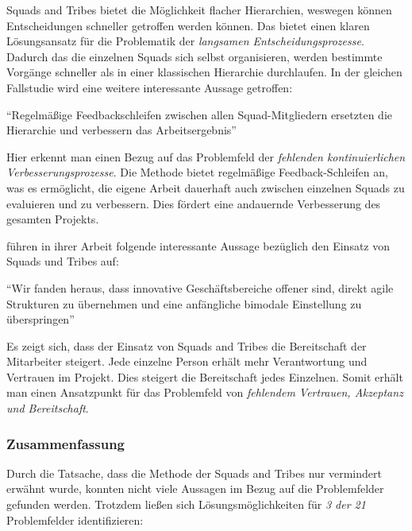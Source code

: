 Squads and Tribes bietet die Möglichkeit flacher Hierarchien, weswegen können Entscheidungen schneller getroffen werden können. Das bietet einen klaren Lösungsansatz für die Problematik der \textit{langsamen Entscheidungsprozesse}. Dadurch das die einzelnen Squads sich selbst  organisieren, werden bestimmte Vorgänge schneller als in einer klassischen Hierarchie durchlaufen. In der gleichen Fallstudie wird eine weitere interessante  Aussage getroffen:

\begin{center}
	``Regelmäßige Feedbackschleifen zwischen allen Squad-Mitgliedern ersetzten die Hierarchie und verbessern das Arbeitsergebnis'' \cite[S. 98]{heinemann_digitale_2016}
\end{center}

Hier erkennt man einen Bezug auf das Problemfeld der \textit{fehlenden kontinuierlichen Verbesserungsprozesse}. Die Methode bietet regelmäßige Feedback-Schleifen an, was es ermöglicht, die eigene Arbeit dauerhaft auch zwischen einzelnen Squads zu evaluieren und zu verbessern. Dies fördert eine andauernde Verbesserung des gesamten Projekts.

 führen in ihrer Arbeit folgende interessante Aussage bezüglich den Einsatz von Squads und Tribes auf:

\begin{center}
	``Wir fanden heraus, dass innovative Geschäftsbereiche offener sind, direkt agile Strukturen zu übernehmen und eine anfängliche bimodale Einstellung zu überspringen'' \cite[S. 9]{gerster_how_2019}
\end{center}

Es zeigt sich, dass der Einsatz von Squads and Tribes die Bereitschaft der Mitarbeiter steigert. Jede einzelne Person erhält mehr Verantwortung und Vertrauen im Projekt. Dies steigert die Bereitschaft jedes Einzelnen. Somit erhält man einen Ansatzpunkt für das Problemfeld von \textit{fehlendem Vertrauen, Akzeptanz und Bereitschaft}.

\subsubsection{Zusammenfassung}

Durch die Tatsache, dass die Methode der Squads and Tribes nur vermindert erwähnt wurde, konnten nicht viele Aussagen im Bezug auf die Problemfelder gefunden werden. Trotzdem ließen sich Lösungsmöglichkeiten für \textit{3 der 21} Problemfelder identifizieren:

